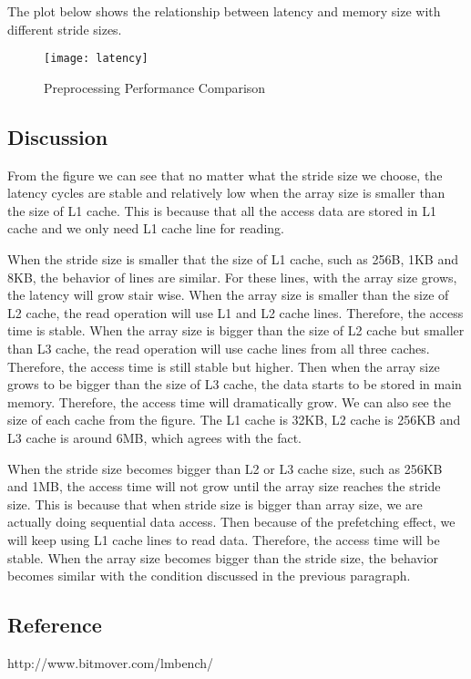 The plot below shows the relationship between latency and memory size with different stride sizes.

\begin{figure}[hbtp]
    \centering
    \texttt{[image: latency]}
    \caption{Preprocessing Performance Comparison}
\end{figure}

\subsection{Discussion}
From the figure we can see that no matter what the stride size we choose, the latency cycles are stable and relatively low when the array size is smaller than the size of L1 cache. This is because that all the access data are stored in L1 cache and we only need L1 cache line for reading. 

When the stride size is smaller that the size of L1 cache, such as 256B, 1KB and 8KB, the behavior of lines are similar. For these lines, with the array size grows, the latency will grow stair wise. When the array size is smaller than the size of L2 cache, the read operation will use L1 and L2 cache lines. Therefore, the access time is stable. When the array size is bigger than the size of L2 cache but smaller than L3 cache, the read operation will use cache lines from all three caches. Therefore, the access time is still stable but higher. Then when the array size grows to be bigger than the size of L3 cache, the data starts to be stored in main memory. Therefore, the access time will dramatically grow. We can also see the size of each cache from the figure. The L1 cache is 32KB, L2 cache is 256KB and L3 cache is around 6MB, which agrees with the fact.

When the stride size becomes bigger than L2 or L3 cache size, such as 256KB and 1MB, the access time will not grow until the array size reaches the stride size. This is because that when stride size is bigger than array size, we are actually doing sequential data access. Then because of the prefetching effect, we will keep using L1 cache lines to read data. Therefore, the access time will be stable. When the array size becomes bigger than the stride size, the behavior becomes similar with the condition discussed in the previous paragraph. 

\subsection{Reference}
http://www.bitmover.com/lmbench/
